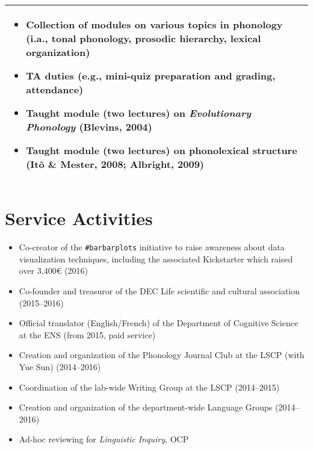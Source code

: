 \documentclass[a4paper, 10pt]{article}
\begin{document}
\begin{center}
\begin{tabular}{|p{16cm}|}
\begin{itemize}[noitemsep]
\item Collection of modules on various topics in phonology (i.a.,
  tonal phonology, prosodic hierarchy, lexical organization)

\item TA duties (e.g., mini-quiz preparation and grading, attendance)

\item Taught module (two lectures) on \emph{Evolutionary
    Phonology} (Blevins, 2004) 

\item Taught module (two lectures) on phonolexical structure (Itô \&
  Mester, 2008; Albright, 2009)        

\end{itemize}\\

\hline
\end{tabular}



\end{center}


\section*{Service Activities}

\begin{itemize}
\RaggedRight

\item Co-creator of the \texttt{\#barbarplots} initiative to raise
  awareness about data visualization techniques, including the
  associated Kickstarter which raised over 3,400€ (2016)

\item Co-founder and treasuror of the DEC Life scientific and cultural
  association (2015--2016)

\item Official translator (English/French) of the Department of Cognitive Science at
  the ENS (from 2015, paid service)

\item Creation and organization of the Phonology Journal Club at the
  LSCP (with Yue Sun) (2014--2016)

\item Coordination of the lab-wide Writing Group at the LSCP (2014--2015)

\item Creation and organization of the department-wide Language Groups
  (2014--2016)

\item Ad-hoc reviewing for \emph{Linguistic Inquiry}, OCP


\end{itemize}
\end{document}
